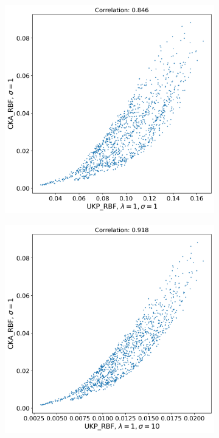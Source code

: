 \documentclass[11pt]{article}
\theoremstyle{plain}
\begin{document}
\begin{figure}[!h]
    \centering
    \begin{subfigure}[b]{0.45\textwidth}
        \includegraphics[width=\textwidth]{Appendix figures/mnist_experiments/Correlation/Correlation plot for CKA_dist_RBF_1.000000e+00 and UKP_dist_RBF_1.000000e+00_1.000000e+00.png}
    \end{subfigure}
    \hfill
    \begin{subfigure}[b]{0.45\textwidth}
        \includegraphics[width=\textwidth]{Appendix figures/mnist_experiments/Correlation/Correlation plot for CKA_dist_RBF_1.000000e+00 and UKP_dist_RBF_1.000000e+00_1.000000e+01.png}
    \end{subfigure}
    

\end{figure}
\end{document}
